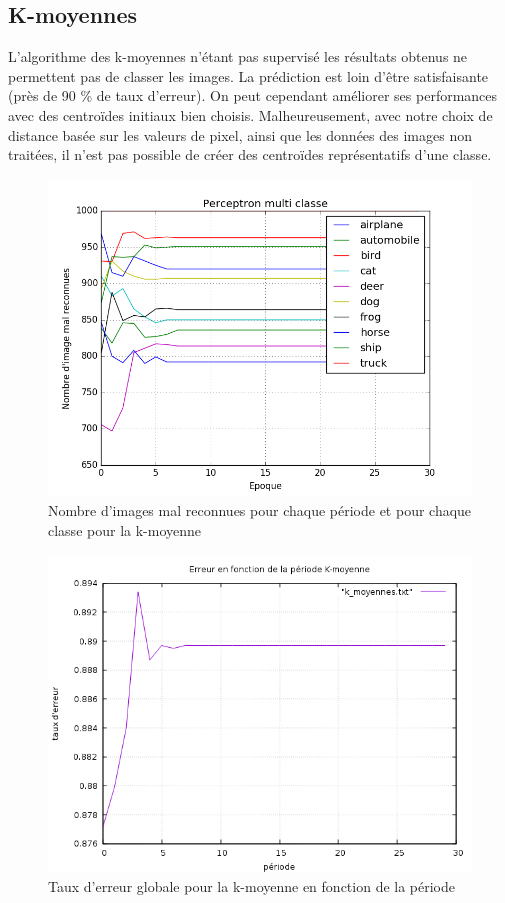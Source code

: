 \subsection{K-moyennes}
L'algorithme des k-moyennes n'étant pas supervisé les résultats obtenus ne permettent pas de classer les images. La prédiction est loin d'être satisfaisante (près de 90 \% de taux d'erreur).
On peut cependant améliorer ses performances avec des centroïdes initiaux bien choisis. Malheureusement, avec notre choix de distance basée sur les valeurs de pixel, ainsi que les données des images non traitées, il n'est pas possible de créer des centroïdes représentatifs d'une classe.

\begin{figure}[H]
\begin{center}
\includegraphics[width=\textwidth]{images/k-moyennes.png}
\caption{Nombre d'images mal reconnues pour chaque période et pour chaque classe pour la k-moyenne}
\label{fig:k_moyenne}
\end{center}
\end{figure}

\begin{figure}[H]
\begin{center}
\includegraphics[width=\textwidth]{images/erreur_k_moyenne.png}
\caption{Taux d'erreur globale pour la k-moyenne en fonction de la période}
\label{fig:erreur-k-moyenne}
\end{center}
\end{figure}
